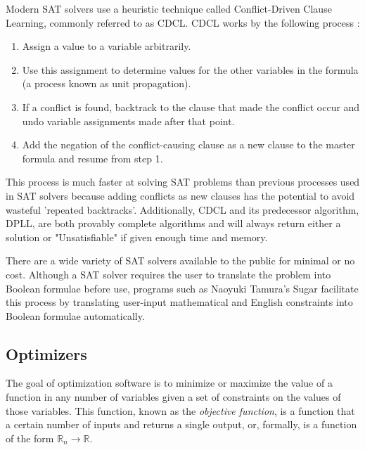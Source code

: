 \documentclass[5p,times,11pt]{elsarticle}
\begin{document}
Modern SAT solvers use a heuristic technique called Conflict-Driven Clause Learning, commonly referred to as CDCL. CDCL works by the following process \cite{cdcl}:

\begin{enumerate}

\item Assign a value to a variable arbitrarily.
\item Use this assignment to determine values for the other variables in the formula (a process known as unit propagation).
\item If a conflict is found, backtrack to the clause that made the conflict occur and undo variable assignments made after that point.
\item Add the negation of the conflict-causing clause as a new clause to the master formula and resume from step 1.

\end{enumerate}

This process is much faster at solving SAT problems than previous processes used in SAT solvers because adding conflicts as new clauses has the potential to avoid wasteful 'repeated backtracks'. Additionally, CDCL and its predecessor algorithm, DPLL, are both provably complete algorithms and will always return either a solution or "Unsatisfiable" if given enough time and memory.

There are a wide variety of SAT solvers available to the public for minimal or no cost. Although a SAT solver requires the user to translate the problem into Boolean formulae before use,  programs such as Naoyuki Tamura's Sugar facilitate this process by translating user-input mathematical and English constraints into Boolean formulae automatically.


\subsection{Optimizers}

The goal of optimization software is to minimize or maximize the value of a function in any number of variables given a set of constraints on the values of those variables.\cite{lpintro} This function, known as the \textit{objective function}, is a function that a certain number of inputs and returns a single output, or, formally, is a function of the form $\mathbb{R}_n \rightarrow  \mathbb{R}$.
\end{document}
